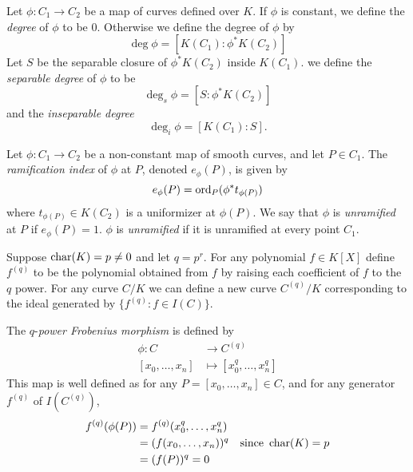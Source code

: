 \begin{definition}
	Let $\phi: C_1 \to C_2$ be a map of curves defined over $K$.
	If $\phi$ is constant, we define the \emph{degree} of $\phi$ to be $0$.
	Otherwise we define the degree of $\phi$ by
	\begin{equation*}
		\deg\phi = [K(C_1): \phi^*K(C_2)]
	\end{equation*}
	Let $S$ be the separable closure of $\phi^*K(C_2)$ inside $K(C_1)$.
	we define the \emph{separable degree} of $\phi$ to be
	\begin{equation*}
		\deg_s\phi = [S: \phi^*K(C_2)]
	\end{equation*}
	and the \emph{inseparable degree}
	\begin{equation*}
		\deg_i\phi = [K(C_1): S].
	\end{equation*}
\end{definition}

\begin{definition}
	Let $\phi: C_1 \to C_2$ be a non-constant map of smooth curves, and let
	$P \in C_1$. The \emph{ramification index} of $\phi$ at $P$, denoted
	$e_\phi(P)$, is given by
	\begin{equation*}
		e_\phi(P) = \operatorname{ord}_P(\phi^*t_{\phi(P)})
	\end{equation*}
	where $t_{\phi(P)} \in K(C_2)$ is a uniformizer at $\phi(P)$.
	We say that $\phi$ is \emph{unramified} at $P$ if $e_\phi(P) = 1$. $\phi$ is
	\emph{unramified} if it is unramified at every point $C_1$.
\end{definition}

\begin{definition}
	Suppose $\operatorname{char}(K) = p \neq 0$ and let $q = p^r$.
	For any polynomial $f \in K[X]$ define $f^{(q)}$ to be the polynomial
	obtained from $f$ by raising each coefficient of $f$ to the $q$ power.
	For any curve $C/K$ we can define a new curve $C^{(q)}/K$ corresponding
	to the ideal generated by $\{f^{(q)}: f \in I(C)\}$.
	
	The $q$-\emph{power Frobenius morphism} is defined by
	\begin{align*}
		\phi: C &\to C^{(q)}\\
		[x_0, \dots, x_n] &\mapsto [x_0^q, \dots, x_n^q]
	\end{align*}
	This map is well defined as for any $P = [x_0, \dots, x_n] \in C$, and
	for any generator $f^{(q)}$ of $I(C^{(q)})$,
	\begin{align*}
		f^{(q)}(\phi(P)) &= f^{(q)}(x_0^q, \dots, x_n^q)\\
		&= (f(x_0, \dots, x_n))^q&\textrm{since }\operatorname{char}(K) = p\\
		&= (f(P))^q = 0
	\end{align*}
\end{definition}


